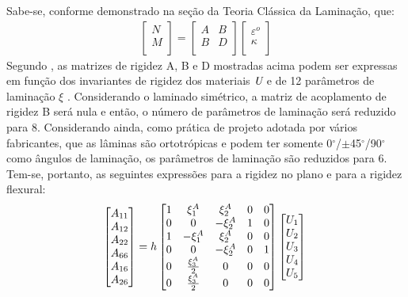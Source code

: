 Sabe-se, conforme demonstrado na seção da Teoria Clássica da Laminação, que:
\begin{equation} \label{ABD_definition}
\begin{gathered}
\begin{bmatrix}
    N \\
    M \\
\end{bmatrix}
=
\begin{bmatrix}
		A & B \\
		B & D \\
\end{bmatrix}
\begin{bmatrix}
    \varepsilon^o \\
    \kappa \\
\end{bmatrix}
\end{gathered}
\end{equation}
Segundo \cite{liu2004maximization}, as matrizes de rigidez A, B e D mostradas acima podem ser expressas em função dos invariantes de rigidez dos materiais $\emph{U}$ e de 12 parâmetros de laminação $\xi$ \cite{tsai1968invariant}. Considerando o laminado simétrico, a matriz de acoplamento de rigidez B será nula e então, o número de parâmetros de laminação será reduzido para 8. Considerando ainda, como prática de projeto adotada por vários fabricantes, que as lâminas são ortotrópicas e podem ter somente 0$^{\circ}$/$\pm$45$^{\circ}$/90$^{\circ}$ como ângulos de laminação, os parâmetros de laminação são reduzidos para 6. Tem-se, portanto, as seguintes expressões para a rigidez no plano e para a rigidez flexural:
\begin{equation} \label{A_matrix}
\begin{bmatrix}
    A_{11} \\A_{12} \\A_{22} \\A_{66} \\A_{16} \\A_{26} \\
\end{bmatrix}
= h\begin{bmatrix}
		1 & \xi^A_1 & \xi^A_2 & 0 & 0 \\
		0 & 0 & -\xi^A_2 & 1 & 0 \\
    1 & -\xi^A_1 & \xi^A_2 & 0 & 0 \\
		0 & 0 & -\xi^A_2 & 0 & 1 \\
		0 & \frac{\xi^A_3}{2} & 0 & 0 & 0 \\
		0 & \frac{\xi^A_3}{2} & 0 & 0 & 0 \\
\end{bmatrix}
\begin{bmatrix}
    U_1\\U_2 \\U_3 \\U_4 \\U_5
\end{bmatrix}\\
\end{equation}
